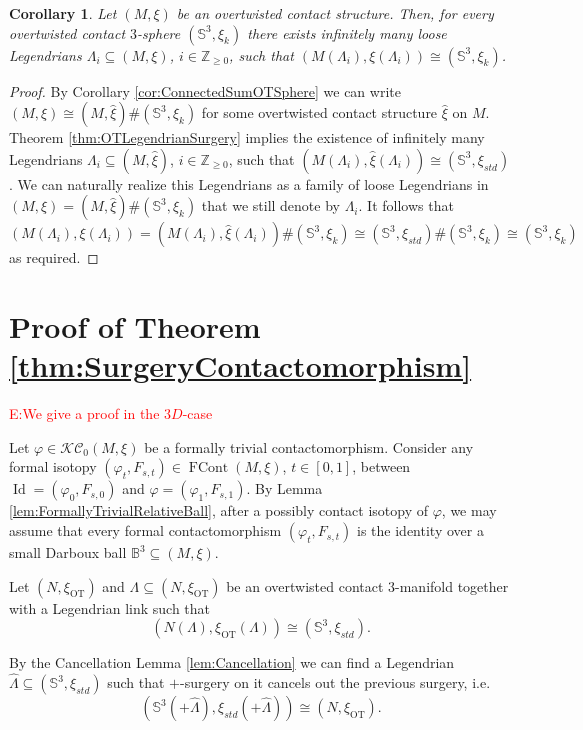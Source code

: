 \documentclass[11pt]{amsart}
\theoremstyle{plain}
\newtheorem{corollary}[theorem]{Corollary}
\theoremstyle{definition}
\theoremstyle{remark}
\numberwithin{theorem}{section}
\newcommand{\Z}{\mathbb{Z}}           %
\newcommand{\NS}{{\mathbb{S}}}
\newcommand{\B}{{\mathbb{B}}}
\newcommand{\KC}{\mathcal{KC}}
\newcommand{\Id}{{\operatorname{Id}}}
\newcommand{\FCont}{\operatorname{FCont}}
\newcommand{\OT}{\operatorname{OT}}
\begin{document}
\begin{corollary}\label{cor:LooseSurgeryOTSpheres}
    Let $(M,\xi)$ be an overtwisted contact structure. Then, for every overtwisted contact $3$-sphere $(\NS^3,\xi_k)$ there exists infinitely many loose Legendrians $\Lambda_i\subseteq (M,\xi)$, $i\in \Z_{\geq 0}$, such that $(M(\Lambda_i),\xi(\Lambda_i))\cong (\NS^3,\xi_k)$.
\end{corollary}
\begin{proof}
  By Corollary \ref{cor:ConnectedSumOTSphere} we can write $(M,\xi)\cong (M,\hat{\xi})\#(\NS^3,\xi_k)$ for some overtwisted contact structure $\hat{\xi}$ on $M$. Theorem \ref{thm:OTLegendrianSurgery} implies the existence of infinitely many Legendrians $\Lambda_i\subseteq (M,\hat{\xi})$, $i\in \Z_{\geq 0}$, such that $(M(\Lambda_i),\hat{\xi}(\Lambda_i))\cong (\NS^3,\xi_{std})$. We can naturally realize this Legendrians as a family of loose Legendrians in $(M,\xi)=(M,\hat{\xi})\#(\NS^3,\xi_k)$ that we still denote by $\Lambda_i$. It follows that 
  $$(M(\Lambda_i),\xi(\Lambda_i))=(M(\Lambda_i),\hat{\xi}(\Lambda_i))\#(\NS^3,\xi_k)\cong(\NS^3,\xi_{std})\#(\NS^3,\xi_k)\cong(\NS^3,\xi_k)$$
  as required.
\end{proof}


\section{Proof of Theorem \ref{thm:SurgeryContactomorphism}}

\textcolor{red}{E:We give a proof in the $3D$-case}

Let $\varphi\in \KC_0(M,\xi)$ be a formally trivial contactomorphism. Consider any formal isotopy $(\varphi_t,F_{s,t})\in\FCont(M,\xi)$, $t\in[0,1]$, between $\Id=(\varphi_0,F_{s,0})$ and $\varphi=(\varphi_1,F_{s,1})$. By Lemma \ref{lem:FormallyTrivialRelativeBall}, after a possibly contact isotopy of $\varphi$, we may assume that every formal contactomorphism $(\varphi_t,F_{s,t})$ is the identity over a small Darboux ball $\B^3\subseteq (M,\xi)$.


Let $(N,\xi_{\OT})$ and $\Lambda\subseteq (N,\xi_{\OT})$ be an overtwisted contact $3$-manifold together with a Legendrian link such that $$(N(\Lambda),\xi_{\OT}(\Lambda))\cong (\NS^3,\xi_{std}).$$

By the Cancellation Lemma \ref{lem:Cancellation} we can find a Legendrian $\hat{\Lambda}\subseteq (\NS^3,\xi_{std})$ such that $+$-surgery on it cancels out the previous surgery, i.e.
$$(\NS^3(+\hat{\Lambda}),\xi_{std}(+\hat{\Lambda}))\cong (N,\xi_{\OT}).$$
\end{document}
